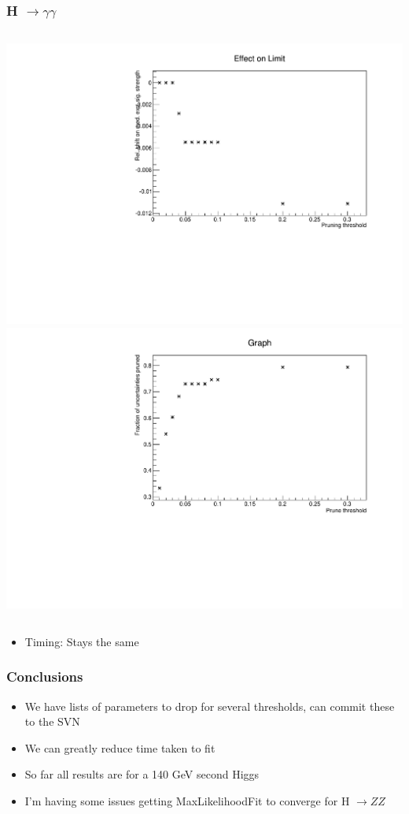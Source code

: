 \documentclass[hyperref=colorlinks]{beamer}
\begin{document}
\begin{frame}
  \frametitle{H $\rightarrow \gamma \gamma$}
  \begin{columns}
    \includegraphics[width=\textwidth]{TalkPics/hggshift.pdf}
    \includegraphics[width=\textwidth]{TalkPics/hggprop.pdf}
  \end{columns}
  \begin{itemize}
  \item Timing: Stays the same
  \end{itemize}  
\end{frame}

\begin{frame}
  \frametitle{Conclusions}
  \begin{itemize}
  \item We have lists of parameters to drop for several thresholds, can commit these to the SVN
  \item We can greatly reduce time taken to fit
  \item So far all results are for a 140 GeV second Higgs
  \item I'm having some issues getting MaxLikelihoodFit to converge for H $\rightarrow ZZ$ 
  \end{itemize}
\end{frame}
\end{document}
